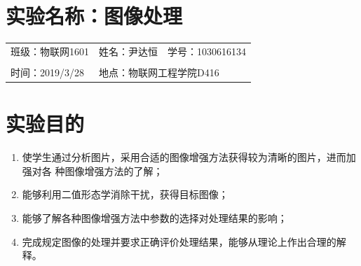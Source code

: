 \documentclass[a4paper]{ctexart}
\begin{document}
\begin{spacing}{1.35}
	\section{实验名称：图像处理}
	\begin{table}[htbp]
		\begin{tabular}{lll}
			班级：物联网1601 & 姓名：尹达恒                                 & 学号：1030616134 \\
			                 &                                              &                  \\
			时间：2019/3/28  & \multicolumn{2}{l}{地点：物联网工程学院D416}                    \\
		\end{tabular}
	\end{table}
	\section{实验目的}
	\begin{enumerate}[1、]
		\item 使学生通过分析图片，采用合适的图像增强方法获得较为清晰的图片，进而加强对各 种图像增强方法的了解；
		\item 能够利用二值形态学消除干扰，获得目标图像；
		\item 能够了解各种图像增强方法中参数的选择对处理结果的影响；
		\item 完成规定图像的处理并要求正确评价处理结果，能够从理论上作出合理的解释。
	\end{enumerate}

\end{spacing}
\end{document}
